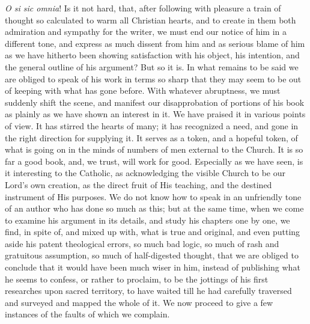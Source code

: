 \emph{O si sic omnia}! Is it not hard, that,
after following with pleasure a train of thought so calculated to warm
all Christian hearts, and to create in them both admiration and
sympathy for the writer, we must end our notice of him in a different
tone, and express as much dissent from him and as serious blame of him
as we have hitherto been showing satisfaction with his object, his
intention, and the general outline of his argument? But so it is. In
what remains to be said we are obliged to speak of his work in terms
so sharp that they may seem to be out of keeping with what has gone
before. With whatever abruptness, we must suddenly shift the
scene, and manifest our disapprobation of portions of his book as
plainly as we have shown an interest in it. We have praised it in
various points of view. It has stirred the hearts of many; it has
recognized a need, and gone in the right direction for supplying it.
It serves as a token, and a hopeful token, of what is going on in the
minds of numbers of men external to the Church. It is so far a good
book, and, we trust, will work for good. Especially as we have seen,
is it interesting to the Catholic, as acknowledging the visible Church
to be our Lord's own creation, as the direct fruit of His teaching,
and the destined instrument of His purposes. We do not know how to
speak in an unfriendly tone of an author who has done so much as this;
but at the same time, when we come to examine his argument in its
details, and study his chapters one by one, we find, in spite of, and
mixed up with, what is true and original, and even putting aside his
patent theological errors, so much bad logic, so much of rash and
gratuitous assumption, so much of half-digested thought, that we are
obliged to conclude that it would have been much wiser in him, instead
of publishing what he seems to confess, or rather to proclaim, to be
the jottings of his first researches upon sacred territory, to have
waited till he had carefully traversed and surveyed and mapped the
whole of it. We now proceed to give a few instances of the faults of
which we complain.

